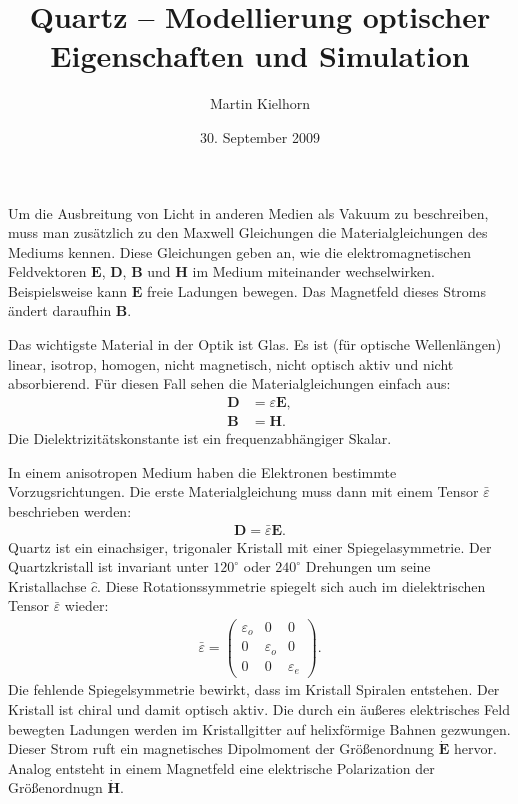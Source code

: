 \documentclass[twocolumn,10pt,DIV18]{scrartcl}
\title{Quartz -- Modellierung optischer Eigenschaften und Simulation}
\author{Martin Kielhorn}
\date{30. September 2009}
\renewcommand{\v}[1]{{\mathbf #1}} %
\newcommand{\T}[1]{{\bar #1}} %
\newcommand{\E}{\v E}
\newcommand{\eps}{\varepsilon}
\newcommand{\D}{\v D}
\newcommand{\B}{\v B}
\renewcommand{\H}{\v H}
\renewcommand{\[}{\left[}
\renewcommand{\]}{\right]}
\renewcommand{\(}{\left(}
\renewcommand{\)}{\right)}
\begin{document}
  \maketitle 

  Um die Ausbreitung von Licht in anderen Medien als Vakuum zu
  beschreiben, muss man zus\"atzlich zu den Maxwell Gleichungen die
  Materialgleichungen des Mediums kennen. Diese Gleichungen geben an,
  wie die elektromagnetischen Feldvektoren $\E$, $\D$, $\B$ und $\H$
  im Medium miteinander wechselwirken. Beispielsweise kann $\E$ freie
  Ladungen bewegen. Das Magnetfeld dieses Stroms \"andert daraufhin $\B$.

  Das wichtigste Material in der Optik ist Glas. Es ist (f\"ur
  optische Wellenl\"angen) linear, isotrop, homogen, nicht magnetisch,
  nicht optisch aktiv und nicht absorbierend. F\"ur diesen Fall sehen
  die Materialgleichungen einfach aus:
  \begin{align}
    \D&=\eps\E,\\
    \B&=\H.
  \end{align}
  Die Dielektrizit\"atskonstante ist ein frequenzabh\"angiger Skalar.
  
  In einem anisotropen Medium haben die Elektronen bestimmte
  Vorzugsrichtungen. Die erste Materialgleichung muss dann mit einem
  Tensor $\T\eps$ beschrieben werden:
  \begin{align}
    \D=\T \eps\E.
  \end{align}
  Quartz ist ein einachsiger, trigonaler Kristall mit einer
  Spiegelasymmetrie. Der Quartzkristall ist invariant unter
  $120^\circ$ oder $240^\circ$ Drehungen um seine Kristallachse $\hat
  c$. Diese Rotationssymmetrie spiegelt sich auch im dielektrischen
  Tensor $\T\eps$ wieder:
  \begin{align}
    \T\eps=\begin{pmatrix}
    \eps_o&0&0\\
    0&\eps_o&0\\
    0&0&\eps_e
    \end{pmatrix}.
  \end{align}
  Die fehlende Spiegelsymmetrie bewirkt, dass im Kristall Spiralen
  entstehen. Der Kristall ist chiral und damit optisch aktiv. Die
  durch ein \"au\ss eres elektrisches Feld bewegten Ladungen werden im
  Kristallgitter auf helixf\"ormige Bahnen gezwungen. Dieser Strom
  ruft ein magnetisches Dipolmoment der Gr\"o\ss enordnung $\dot\E$
  hervor. Analog entsteht in einem Magnetfeld eine elektrische
  Polarization der Gr\"o\ss enordnugn $\dot\H$.
  
\end{document}
